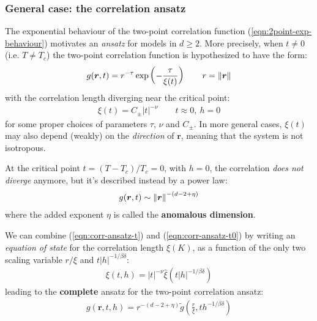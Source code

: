 \documentclass[../../main.tex]{subfiles}
\begin{document}
\subsubsection{General case: the correlation ansatz}
The exponential behaviour of the two-point correlation function (\ref{eqn:2point-exp-behaviour}) motivates an \textit{ansatz} for models in $d \geq 2$. More precisely, when $t \neq 0$ (i.e. $T \neq T_c$) the two-point correlation function is hypothesized to have the form:
\begin{align}\label{eqn:corr-ansatz-t}
    g(\bm{r}, t) = r^{-\tau} \exp\left(-\frac{\tau}{\xi(t)} \right) \qquad r=\norm{\bm{r}}
\end{align} 
with the correlation length diverging near the critical point:
\begin{align}\label{eqn:corr-length-t}
    \xi(t) = C_\pm |t|^{-\nu} \qquad t \approx 0, \> h = 0
\end{align}
for some proper choices of parameters $\tau$, $\nu$ and $C_\pm$. In more general cases, $\xi(t)$ may also depend (weakly) on the \textit{direction} of $\bm{r}$, meaning that the system is not isotropous.

\medskip

At the critical point $t = (T-T_c)/T_c = 0$, with $h=0$, the correlation \textit{does not diverge} anymore, but it's described instead by a power law: 
\begin{align}
    g(\bm{r}, t) \sim \norm{\bm{r}}^{-(d-2 + \eta)}\label{eqn:corr-ansatz-t0}
\end{align}
where the added exponent $\eta$ is called the \textbf{anomalous dimension}. 

\medskip

We can combine (\ref{eqn:corr-ansatz-t}) and (\ref{eqn:corr-ansatz-t0}) by writing an \textit{equation of state} for the correlation length $\xi(K)$, as a function of the only two  scaling variable $r/\xi$ and $t |h|^{-1/\beta \delta}$:
\begin{align}\label{eqn:corr-length-ansatz}
    \xi(t, h) = |t|^{-\nu} \hat{\xi} (t |h|^{-1/\beta \delta})
\end{align}
leading to the \textbf{complete} ansatz for the two-point correlation ansatz:
\begin{align}\label{eqn:correlation-ansatz-full}
    g(\bm{r}, t, h) = r^{-(d-2+\eta)} \tilde{g} \left(\frac{r}{\xi}, t h^{-1/\beta \delta} \right)
\end{align} 
\end{document}
